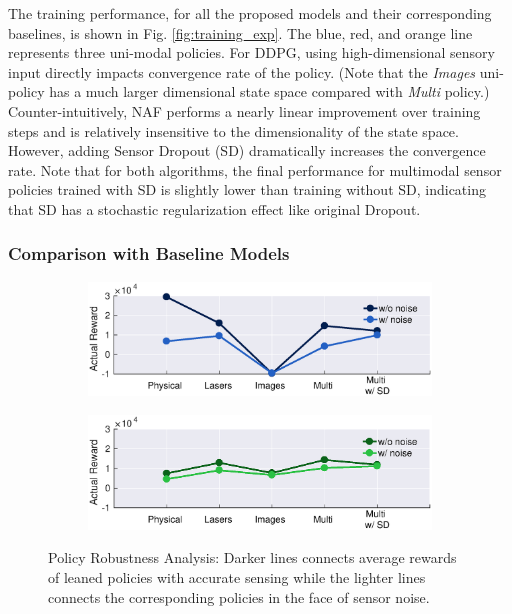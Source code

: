 \documentclass[../thesis.tex]{subfiles}
\begin{document}
The training performance, for all the proposed models and their corresponding baselines, is shown in Fig. \ref{fig:training_exp}. The blue, red, and orange line represents three uni-modal policies.
For DDPG, using high-dimensional sensory input directly impacts convergence rate of the policy. (Note that the \textit{Images} uni-policy has a much larger dimensional state space compared with \textit{Multi} policy.)
Counter-intuitively, NAF performs a nearly linear improvement over training steps and is relatively insensitive to the dimensionality of the state space. However, adding Sensor Dropout (SD) dramatically increases the convergence rate.
Note that for both algorithms, the final performance for multimodal sensor policies trained with SD is slightly lower than training without SD, indicating that SD has a stochastic regularization effect like original Dropout.
 
 
\subsubsection{Comparison with Baseline Models}
 
\begin{figure}[t]
    \centering
    \begin{subfigure}[b]{0.48\linewidth}
        \includegraphics[width=\columnwidth,trim= 45 180 45 10, clip=true]{./MultimodalDRL/fig/actual_robust_naf}
        \label{fig:actual_robust_naf}
    \end{subfigure}
    \begin{subfigure}[b]{0.48\linewidth}
        \includegraphics[width=\columnwidth,trim= 45 180 45 10, clip=true]{./MultimodalDRL/fig/actual_robust_ddpg}
        \label{fig:actual_robust_ddpg}
    \end{subfigure}
    \caption{Policy Robustness Analysis: Darker lines connects average rewards of leaned policies with accurate sensing while the lighter lines connects the corresponding policies in the face of sensor noise.}
    \label{fig:actual_robust}
\end{figure}
 
\end{document}
